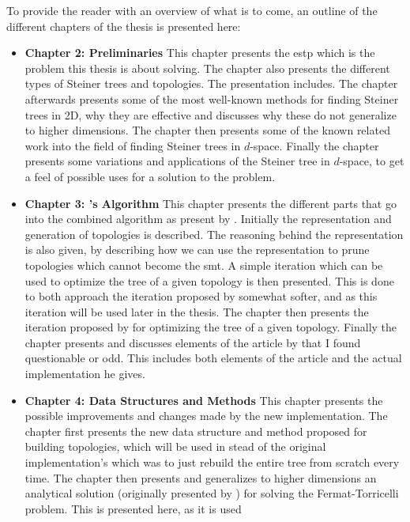 To provide the reader with an overview of what is to come, an
outline of the different chapters of the thesis is presented here:

\begin{itemize}
\item \textbf{Chapter 2: Preliminaries} \quad This chapter presents the
  \acl{estp} which is the problem this thesis is about solving. The chapter also
  presents the different types of Steiner trees and topologies. The presentation
  includes. The chapter afterwards presents some of the most well-known methods
  for finding Steiner trees in 2D, why they are effective and discusses why these
  do not generalize to higher dimensions. The chapter then presents some of
  the known related work into the field of finding Steiner trees in $d$-space.
  Finally the chapter presents some variations and applications of the Steiner
  tree in $d$-space, to get a feel of possible uses for a solution to the
  problem.
\item \textbf{Chapter 3: \citeauthor{smith1992}'s Algorithm} \quad This chapter
  presents the different parts that go into the combined algorithm as present by
  \textcite{smith1992}. Initially the representation and generation of
  topologies is described. The reasoning behind the representation is also
  given, by describing how we can use the representation to prune topologies
  which cannot become the \acl{smt}. A simple iteration which can be used to
  optimize the tree of a given topology is then presented. This is done to both
  approach the iteration proposed by \citeauthor{smith1992} somewhat softer, and
  as this iteration will be used later in the thesis. The chapter then presents
  the iteration proposed by \citeauthor{smith1992} for optimizing the tree of a
  given topology. Finally the chapter presents and discusses elements of the
  article by \textcite{smith1992} that I found questionable or odd. This
  includes both elements of the article and the actual implementation he gives.
\item \textbf{Chapter 4: Data Structures and Methods} \quad This chapter
  presents the possible improvements and changes made by the new implementation.
  The chapter first presents the new data structure and method proposed for
  building topologies, which will be used in stead of the original
  implementation's which was to just rebuild the entire tree from scratch every
  time. The chapter then presents and generalizes to higher dimensions an
  analytical solution (originally presented by \textcite{uteshev2014}) for
  solving the Fermat-Torricelli problem. This is presented here, as it is used

\end{itemize}
